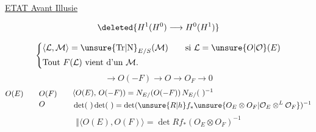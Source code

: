 
\uline{ETAT Avant \uline{Illusie}}

\[
\deleted{H^1(H^0)\longrightarrow H^0(H^1)}
\]

\[
\left\{\begin{aligned}
&\langle\mathcal L,\mathcal M\rangle=\unsure{\mathrm{Tr}|\mathrm N}_{E/S}(\mathcal M)\qquad\text{si }\mathcal L=\unsure{O|\mathcal O}(E)\\
&\text{Tout }F(\mathcal L)\text{ vient d'un }\mathcal M.
\end{aligned}\right.
\]
\[
\longrightarrow O(-F)\longrightarrow O\longrightarrow O_F\longrightarrow0
\]
\[
\begin{aligned}
O(E)\qquad &O(F)\\[-1pt]
&O
\end{aligned}
\qquad
\begin{aligned}
&\langle O(E),\,O(-F))=N_{E/}(O(-F))\,N_{E/}(\ )^{-1}\\
&\det(\ )\det(\ )=\det(\unsure{R|h}f_*\unsure{O_E\otimes O_F|\mathcal O_E\otimes^{L}\mathcal O_F})^{-1}
\end{aligned}
\]
\[
\Big\Vert\langle O(E),O(F)\rangle=\det Rf_*(O_E\otimes O_F)^{-1}
\]

